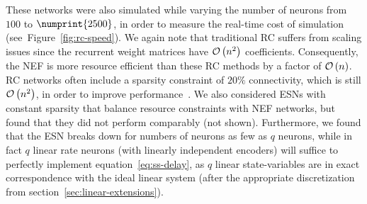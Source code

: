 These networks were also simulated while varying the number of neurons from $100$ to $\numprint{2500}$, in order to measure the real-time cost of simulation (see~Figure~\ref{fig:rc-speed}).
We again note that traditional RC suffers from scaling issues since the recurrent weight matrices have $\mathcal{O}\left({ n^2 }\right)$ coefficients.
Consequently, the NEF is more resource efficient than these RC methods by a factor of $\mathcal{O}\left({ n }\right)$.
RC networks often include a sparsity constraint of $20\%$ connectivity, which is still $\mathcal{O}\left({n^2}\right)$, in order to improve performance~\citep{lukovsevivcius2012practical, lukovsevicius2012reservoir}.
We also considered ESNs with constant sparsity that balance resource constraints with NEF networks, but found that they did not perform comparably (not shown).
Furthermore, we found that the ESN breaks down for numbers of neurons as few as $q$ neurons, while in fact $q$ linear rate neurons (with linearly independent encoders) will suffice to perfectly implement equation~\ref{eq:ss-delay}, as $q$ linear state-variables are in exact correspondence with the ideal linear system (after the appropriate discretization from section~\ref{sec:linear-extensions}).

